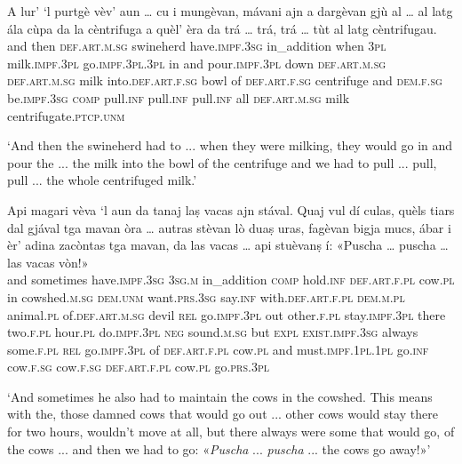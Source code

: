 \begin{linenumbers}
	\gll A lur’ `l purtgè vèv’ aun … cu i mungèvan, mávani ajn a dargèvan gjù al … al latg ála cùpa da la cèntrifuga a quèl’ èra da trá … trá, trá … tùt al latg cèntrifugau.\\
	and then \textsc{def.art.m.sg} swineherd have.\textsc{impf.3sg} in\_addition {} when \textsc{3pl} milk.\textsc{impf.3pl} go.\textsc{impf.3pl.3pl} in and pour.\textsc{impf.3pl} down \textsc{def.art.m.sg} {} \textsc{def.art.m.sg} milk into.\textsc{def.art.f.sg} bowl of \textsc{def.art.f.sg} centrifuge and \textsc{dem.f.sg} be.\textsc{impf.3sg} \textsc{comp} pull.\textsc{inf} {} pull.\textsc{inf} pull.\textsc{inf} {} all \textsc{def.art.m.sg} milk centrifugate.\textsc{ptcp.unm}    \\
\end{linenumbers}
\medskip
\glt `And then the swineherd had to ... when they were milking, they would go in and pour the ... the milk into the bowl of the centrifuge and we had to pull ... pull, pull ... the whole centrifuged milk.'
\medskip

\begin{linenumbers}
	\gll Api magari vèva `l aun da tanaj laṣ vacas ajn stával.\footnotemark{} Quaj vul dí culas,\footnotemark{} quèls tiars dal gjával tga mavan òra … autras stèvan lò duaṣ uras, fagèvan bigja mucs, ábar i èr’ adina zacòntas tga mavan, da las vacas …  api stuèvanṣ í: «Puscha … puscha\footnotemark{} … las vacas vòn!» \\
and sometimes have.\textsc{impf.3sg} \textsc{3sg.m} in\_addition \textsc{comp} hold.\textsc{inf} \textsc{def.art.f.pl} cow.\textsc{pl} in cowshed.\textsc{m.sg} \textsc{dem.unm} want.\textsc{prs.3sg} say.\textsc{inf} with.\textsc{def.art.f.pl} \textsc{dem.m.pl} animal.\textsc{pl} of.\textsc{def.art.m.sg} devil \textsc{rel} go.\textsc{impf.3pl} out {} other.\textsc{f.pl} stay.\textsc{impf.3pl} there two.\textsc{f.pl} hour.\textsc{pl} do.\textsc{impf.3pl} \textsc{neg} sound.\textsc{m.sg} but \textsc{expl} \textsc{exist.impf.3sg} always some.\textsc{f.pl} \textsc{rel} go.\textsc{impf.3pl} of \textsc{def.art.f.pl} cow.\textsc{pl} {} and must.\textsc{impf.1pl.1pl} go.\textsc{inf} cow.\textsc{f.sg} {} cow.\textsc{f.sg} {} \textsc{def.art.f.pl} cow.\textsc{pl} go.\textsc{prs.3pl}\\
\end{linenumbers}
\medskip
\glt `And sometimes he also had to maintain the cows in the cowshed. This means with the, those damned cows that would go out ... other cows would stay there for two hours, wouldn't move at all, but there always were some that would go, of the cows ... and then we had to go: «\textit{Puscha} ... \textit{puscha} ... the cows go away!»'
 
\medskip

